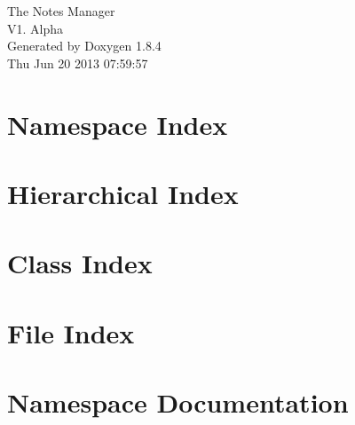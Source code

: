 \documentclass[twoside]{book}
\newcommand{\clearemptydoublepage}{%
  \newpage{\pagestyle{empty}\cleardoublepage}%
}
\begin{document}
\hypersetup{pageanchor=false}
\begin{titlepage}
\vspace*{7cm}
\begin{center}%
{\Large The Notes Manager \\[1ex]\large V1. Alpha }\\
\vspace*{1cm}
{\large Generated by Doxygen 1.8.4}\\
\vspace*{0.5cm}
{\small Thu Jun 20 2013 07:59:57}\\
\end{center}
\end{titlepage}
\clearemptydoublepage
\tableofcontents
\clearemptydoublepage
{}
\hypersetup{pageanchor=true}

\chapter{Namespace Index}

\chapter{Hierarchical Index}

\chapter{Class Index}

\chapter{File Index}

\chapter{Namespace Documentation}







\end{document}
